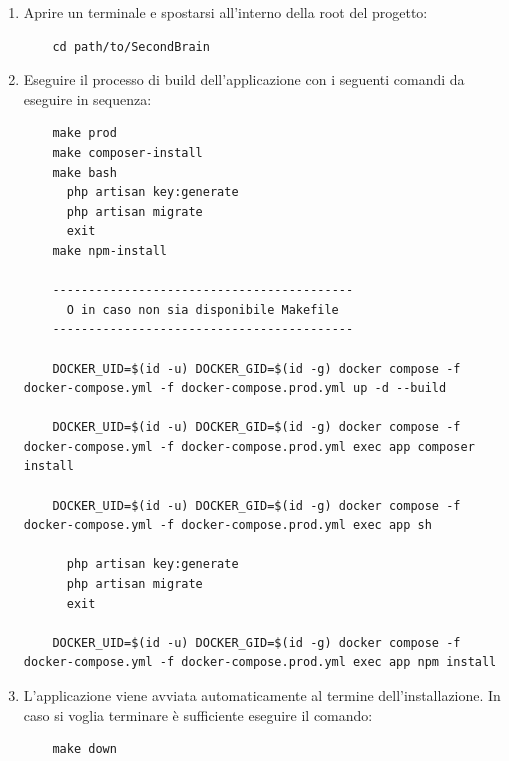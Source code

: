 \documentclass[a4paper,10pt]{article}
\begin{document}
\begin{enumerate}

  \item Aprire un terminale e spostarsi all'interno della root del progetto: 
  \begin{lstlisting}
    cd path/to/SecondBrain
  \end{lstlisting}

  \item Eseguire il processo di build dell'applicazione con i seguenti comandi da eseguire in sequenza:

  \begin{lstlisting}
    make prod
    make composer-install
    make bash
      php artisan key:generate
      php artisan migrate
      exit
    make npm-install

    ------------------------------------------
      O in caso non sia disponibile Makefile
    ------------------------------------------
    
    DOCKER_UID=$(id -u) DOCKER_GID=$(id -g) docker compose -f docker-compose.yml -f docker-compose.prod.yml up -d --build

    DOCKER_UID=$(id -u) DOCKER_GID=$(id -g) docker compose -f docker-compose.yml -f docker-compose.prod.yml exec app composer install

    DOCKER_UID=$(id -u) DOCKER_GID=$(id -g) docker compose -f docker-compose.yml -f docker-compose.prod.yml exec app sh

      php artisan key:generate
      php artisan migrate
      exit

    DOCKER_UID=$(id -u) DOCKER_GID=$(id -g) docker compose -f docker-compose.yml -f docker-compose.prod.yml exec app npm install
  \end{lstlisting}

  \item L'applicazione viene avviata automaticamente al termine dell'installazione. In caso si voglia terminare è sufficiente eseguire il comando:
  
  \begin{lstlisting}
    make down
  \end{lstlisting}

\end{enumerate}
\end{document}
